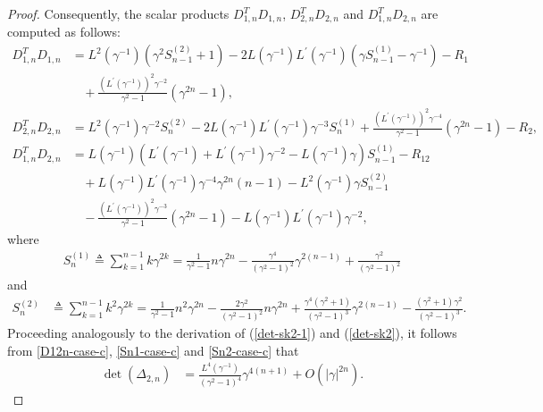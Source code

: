 \documentclass[12pt]{article}
\begin{document}
\begin{proof}
Consequently, the scalar products $D^T_{1,n}D_{1,n}$, $D^T_{2,n}D_{2,n}$ and $D^T_{1,n}D_{2,n}$ are computed as follows:
\begin{equation}\label{D12n-case-c}
\begin{aligned}
D^T_{1,n}D_{1,n}&= L^2(\gamma^{-1})\left(\gamma^2S^{(2)}_{n-1}+1\right) -2L(\gamma^{-1})L^\prime(\gamma^{-1})\left(\gamma S^{(1)}_{n-1} -\gamma^{-1}\right)-R_1\\
&~~~~+\frac{(L^\prime(\gamma^{-1}))^2\gamma^{-2}}{\gamma^2-1}(\gamma^{2n}-1),\\
D^T_{2,n}D_{2,n}&= L^2(\gamma^{-1})\gamma^{-2}S_n^{(2)} -2L(\gamma^{-1})L^\prime(\gamma^{-1})\gamma^{-3}S_n^{(1)} +\frac{(L^\prime(\gamma^{-1}))^2\gamma^{-4}}{\gamma^2-1}(\gamma^{2n}-1)-R_2,\\
D^T_{1,n}D_{2,n}&= L(\gamma^{-1})\left(L^\prime(\gamma^{-1})+L^\prime(\gamma^{-1})\gamma^{-2}-L(\gamma^{-1})\gamma\right)S_{n-1}^{(1)}-R_{12}\\
&~~~~+L(\gamma^{-1})L^\prime(\gamma^{-1})\gamma^{-4}\gamma^{2n}(n-1) - L^2(\gamma^{-1})\gamma S^{(2)}_{n-1} \\
&~~~~-\frac{(L^\prime(\gamma^{-1}))^2\gamma^{-3}}{\gamma^2-1}(\gamma^{2n}-1) - L(\gamma^{-1})L^\prime(\gamma^{-1})\gamma^{-2},
\end{aligned}
\end{equation}
where
\begin{equation}\label{Sn1-case-c}
\begin{aligned}
S^{(1)}_n \triangleq \sum_{k=1}^{n-1}k\gamma^{2k}=\frac{1}{\gamma^2-1}n\gamma^{2n} - \frac{\gamma^4}{(\gamma^2-1)^2}\gamma^{2(n-1)} + \frac{\gamma^2}{(\gamma^2-1)^2}
\end{aligned}
\end{equation}
and
\begin{equation}\label{Sn2-case-c}
   \begin{aligned}
      S^{(2)}_n &\triangleq \sum_{k=1}^{n-1}k^2\gamma^{2k}=\frac{1}{\gamma^2-1}n^2\gamma^{2n} - \frac{2\gamma^2}{(\gamma^2-1)^2}n\gamma^{2n} + \frac{\gamma^4(\gamma^2+1)}{(\gamma^2-1)^3}\gamma^{2(n-1)}-\frac{(\gamma^2+1)\gamma^2}{(\gamma^2-1)^3}.
   \end{aligned}
\end{equation}
Proceeding analogously to the derivation of (\ref{det-sk2-1}) and (\ref{det-sk2}), it follows from \eqref{D12n-case-c}, \eqref{Sn1-case-c} and \eqref{Sn2-case-c} that 
\begin{equation}\label{det-sk2-case-c}
   \begin{aligned}
   \det(\Delta_{2,n})&=\frac{L^4(\gamma^{-1})}{(\gamma^2-1)^4}\gamma^{4(n+1)} + O(|\gamma|^{2n}).

\end{aligned}
\end{equation}
\end{proof}
\end{document}
